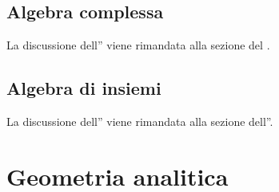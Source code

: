\documentclass[letterpaper,10pt,italian]{jupyterBook}
\begin{document}
\sphinxstepscope




\chapter{Algebra complessa}
\label{\detokenize{ch/algebra/complex-algebra-link:algebra-complessa}}\label{\detokenize{ch/algebra/complex-algebra-link:math-hs-algebra-complex-link}}\label{\detokenize{ch/algebra/complex-algebra-link::doc}}
\sphinxAtStartPar
La discussione dell”{\hyperref[\detokenize{ch/algebra/complex-algebra:math-hs-algebra-complex}]{}} viene rimandata alla sezione del {\hyperref[\detokenize{ch/precalculus:math-hs-precalculus}]{}}.

\sphinxstepscope




\chapter{Algebra di insiemi}
\label{\detokenize{ch/algebra/set-algebra-link:algebra-di-insiemi}}\label{\detokenize{ch/algebra/set-algebra-link:math-hs-algebra-set-link}}\label{\detokenize{ch/algebra/set-algebra-link::doc}}
\sphinxAtStartPar
La discussione dell”{\hyperref[\detokenize{ch/set:math-hs-set-algebra}]{}} viene rimandata alla sezione dell”{\hyperref[\detokenize{ch/set:math-hs-set}]{}}.

\sphinxstepscope


\part{Geometria analitica}

\sphinxstepscope
\end{document}

